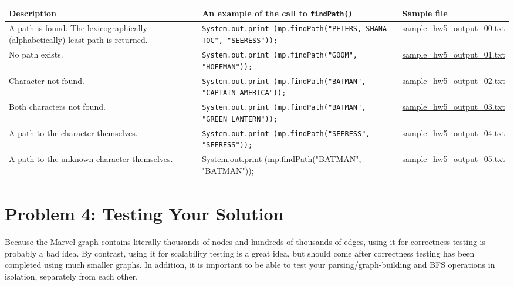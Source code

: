 \documentclass[11pt]{article}
\begin{document}
\begin{center}
\begin{tabular}{ | m{5cm} | m{5cm}| m{5cm} | } 
  \hline
  \textbf{Description} & \textbf{An example of the call to \texttt{findPath()}} & \textbf{Sample file} \\ 
  \hline
  A path is found. The lexicographically (alphabetically) least path is returned. & \texttt{System.out.print
  (mp.findPath("PETERS, SHANA TOC", "SEERESS"));} & \href{https://www.cs.rpi.edu/academics/courses/spring23/csci2600/Documents/sample_hw5_output_00.txt}{sample\_hw5\_output\_00.txt}\\ 
  \hline
  No path exists. & \texttt{System.out.print
  (mp.findPath("GOOM", "HOFFMAN"));} & \href{https://www.cs.rpi.edu/academics/courses/spring23/csci2600/Documents/sample_hw5_output_01.txt}{sample\_hw5\_output\_01.txt} \\ 
  \hline
  Character not found. & \texttt{System.out.print
  (mp.findPath("BATMAN", "CAPTAIN AMERICA"));} & \href{https://www.cs.rpi.edu/academics/courses/spring23/csci2600/Documents/sample_hw5_output_02.txt}{sample\_hw5\_output\_02.txt} \\
  \hline
  Both characters not found. & \texttt{System.out.print
  (mp.findPath("BATMAN", "GREEN LANTERN"));} & \href{https://www.cs.rpi.edu/academics/courses/spring23/csci2600/Documents/sample_hw5_output_03.txt}{sample\_hw5\_output\_03.txt} \\
  \hline
  A path to the character themselves. & \texttt{System.out.print
  (mp.findPath("SEERESS", "SEERESS"));} & \href{https://www.cs.rpi.edu/academics/courses/spring23/csci2600/Documents/sample_hw5_output_04.txt}{sample\_hw5\_output\_04.txt} \\
  \hline
  A path to the unknown character themselves. & System.out.print
  (mp.findPath("BATMAN", "BATMAN")); & \href{https://www.cs.rpi.edu/academics/courses/spring23/csci2600/Documents//sample_hw5_output_05.txt}{sample\_hw5\_output\_05.txt} \\
  \hline
\end{tabular}
\end{center}

\section*{Problem 4: Testing Your Solution}
\label{sec:Problem 4}

Because the Marvel graph contains literally thousands of nodes and hundreds of thousands of edges, using it for correctness testing is probably a bad idea. By contrast, using it for scalability testing is a great idea, but should come after correctness testing has been completed using much smaller graphs. In addition, it is important to be able to test your parsing/graph-building and BFS operations in isolation, separately from each other.
\end{document}

